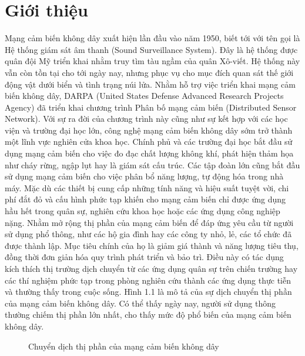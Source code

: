 \chapter{Giới thiệu}
Mạng cảm biến không dây xuất hiện lần đầu vào năm 1950, biết tới với tên gọi là Hệ thống giám sát âm thanh (Sound Surveillance System). Đây là hệ thống được quân đội Mỹ triển khai nhằm truy tìm tàu ngầm của quân Xô-viết. Hệ thống này vẫn còn tồn tại cho tới ngày nay, nhưng phục vụ cho mục đích quan sát thế giới động vật dưới biển và tình trạng núi lửa. \cite{wsn_history}
\linebreak
Nhằm hỗ trợ việc triển khai mạng cảm biến không dây, DARPA (United States Defense Advanced Research Projects Agency) đã triển khai chương trình Phân bố mạng cảm biến (Distributed Sensor Network). Với sự ra đời của chương trình này cũng như sự kết hợp với các học viện và trường đại học lớn, công nghệ mạng cảm biến không dây sớm trở thành một lĩnh vực nghiên cửa khoa học. Chính phủ và các trường đại học bắt đầu sử dụng mạng cảm biến cho việc đo đạc chất lượng không khí, phát hiện thảm họa như cháy rừng, ngập lụt hay là giám sát cấu trúc. Các tập đoàn lớn cũng bắt đầu sử dụng mạng cảm biến cho việc phân bổ năng lượng, tự động hóa trong nhà máy. \cite{wsn_history}
\linebreak
Mặc dù các thiết bị cung cấp những tính năng và hiệu suất tuyệt vời, chi phí đắt đỏ và cấu hình phức tạp khiến cho mạng cảm biến chỉ được ứng dụng hầu hết trong quân sự, nghiên cứu khoa học hoặc các ứng dụng công nghiệp nặng. Nhằm mở rộng thị phần của mạng cảm biến để đáp ứng yêu cầu từ người sử dụng phổ thông, như các hộ gia đình hay các công ty nhỏ, lẻ, các tổ chức đã được thành lập. Mục tiêu chính của họ là giảm giá thành và năng lượng tiêu thụ, đồng thời đơn giản hóa quy trình phát triển và bảo trì. Điều này có tác dụng kích thích thị trường dịch chuyển từ các ứng dụng quân sự trên chiến trường hay các thí nghiệm phức tạp trong phòng nghiên cứu thành các ứng dụng thực tiễn và thường thấy trong cuộc sống. \cite{wsn_history}
\linebreak 
Hình 1.1 là mô tả của sự dịch chuyển thị phần của mạng cảm biến không dây. Có thể thấy ngày nay, người sử dụng thông thường chiếm thị phần lớn nhất, cho thấy mức độ phổ biến của mạng cảm biến không dây.
\linebreak
\begin{figure}[htb]
	\caption{\label{fig:my-label} Chuyển dịch thị phần của mạng cảm biến không dây}
\end{figure}
